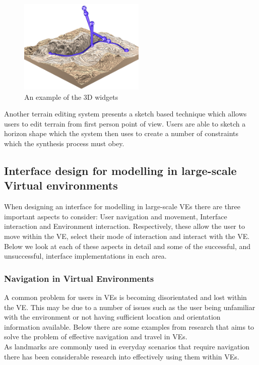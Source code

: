 \documentclass{sig-alternate-05-2015}
\begin{document}
\begin{figure}[H]
	\centering
	\includegraphics[width=6cm]{Terrain1}
	\caption{An example of the 3D widgets}
\end{figure} 

Another terrain editing system presents a sketch based technique which allows users to  edit terrain from first person point of view\cite{Tasse2014}. Users are able to sketch a horizon shape which the system then uses to create a number of constraints which the synthesis process must obey.
\subsection{Interface design for modelling in large-scale Virtual environments}
When designing an interface for modelling in large-scale VEs there are three important aspects to consider: User navigation and movement, Interface interaction and Environment interaction\cite{Bowman2001}. Respectively, these allow the user to move within the VE, select their mode of interaction and interact with the VE. Below we look at each of these aspects in detail and some of the successful, and unsuccessful, interface implementations in each area.
\subsubsection{Navigation in Virtual Environments}
A common problem for users in VEs is becoming disorientated and lost within the VE\cite{Darken1993}. This may be due to a number of issues such as the user being unfamiliar with the environment or not having sufficient location and orientation information available. Below there are some examples from research that aims to solve the problem of effective navigation and travel in VEs.\\

As landmarks are commonly used in everyday scenarios that require navigation there has been considerable research into effectively using them within VEs.
\end{document}
